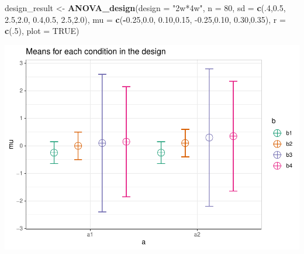 \documentclass[
]{book}
\newenvironment{Shaded}{\begin{snugshade}}{\end{snugshade}}
\newcommand{\DataTypeTok}[1]{\textcolor[rgb]{0.13,0.29,0.53}{#1}}
\newcommand{\DecValTok}[1]{\textcolor[rgb]{0.00,0.00,0.81}{#1}}
\newcommand{\FloatTok}[1]{\textcolor[rgb]{0.00,0.00,0.81}{#1}}
\newcommand{\KeywordTok}[1]{\textcolor[rgb]{0.13,0.29,0.53}{\textbf{#1}}}
\newcommand{\NormalTok}[1]{#1}
\newcommand{\OperatorTok}[1]{\textcolor[rgb]{0.81,0.36,0.00}{\textbf{#1}}}
\newcommand{\OtherTok}[1]{\textcolor[rgb]{0.56,0.35,0.01}{#1}}
\newcommand{\StringTok}[1]{\textcolor[rgb]{0.31,0.60,0.02}{#1}}
\begin{document}
\begin{Shaded}
\begin{Highlighting}[]
\NormalTok{design_result <-}\StringTok{ }\KeywordTok{ANOVA_design}\NormalTok{(}\DataTypeTok{design =} \StringTok{"2w*4w"}\NormalTok{,}
                              \DataTypeTok{n =} \DecValTok{80}\NormalTok{,}
                              \DataTypeTok{sd =} \KeywordTok{c}\NormalTok{(.}\DecValTok{4}\NormalTok{,}\FloatTok{0.5}\NormalTok{, }
                                     \FloatTok{2.5}\NormalTok{,}\FloatTok{2.0}\NormalTok{, }
                                     \FloatTok{0.4}\NormalTok{,}\FloatTok{0.5}\NormalTok{, }
                                     \FloatTok{2.5}\NormalTok{,}\FloatTok{2.0}\NormalTok{),}
                              \DataTypeTok{mu =} \KeywordTok{c}\NormalTok{(}\OperatorTok{-}\FloatTok{0.25}\NormalTok{,}\FloatTok{0.0}\NormalTok{, }
                                     \FloatTok{0.10}\NormalTok{,}\FloatTok{0.15}\NormalTok{, }
                                     \FloatTok{-0.25}\NormalTok{,}\FloatTok{0.10}\NormalTok{, }
                                     \FloatTok{0.30}\NormalTok{,}\FloatTok{0.35}\NormalTok{),}
                              \DataTypeTok{r =} \KeywordTok{c}\NormalTok{(.}\DecValTok{5}\NormalTok{),}
                              \DataTypeTok{plot =} \OtherTok{TRUE}\NormalTok{)}
\end{Highlighting}
\end{Shaded}

\includegraphics{SuperpowerValidation_files/figure-latex/aberson_6.8-1.pdf}

\begin{Shaded}
\end{Shaded}
\end{document}
